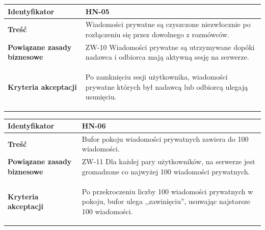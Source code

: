 \vspace{2em}

\begin{tabular}{ | l | l | }
	\hline
		\textbf{Identyfikator} &
		HN-05
		\\

	\hline
		\textbf{Treść} & \parbox[t]{13cm}{
			Wiadomości prywatne są czyszczone niezwłocznie po rozłączeniu się przez dowolnego z rozmówców.
		}\\

	\hline
		\parbox[t]{4cm}{\textbf{Powiązane zasady biznesowe}} & \parbox[t]{13cm}{
			ZW-10 Wiadomości prywatne są utrzymywane dopóki nadawca i odbiorca mają aktywną sesję na serwerze.
		}\\

	\hline
		\parbox[t]{4cm}{\textbf{Kryteria akceptacji}} & \parbox[t]{13cm}{
			\begin{enumreq}
				\item Po zamknięciu sesji użytkownika, wiadomości prywatne których był nadawcą lub odbiorcą ulegają
        usunięciu.
			\end{enumreq}
			}
		\\

	\hline
\end{tabular}

\vspace{2em}

\begin{tabular}{ | l | l | }
	\hline
		\textbf{Identyfikator} &
		HN-06
		\\

	\hline
		\textbf{Treść} & \parbox[t]{13cm}{
			Bufor pokoju wiadomości prywatnych zawiera do 100 wiadomości.
		}\\

	\hline
		\parbox[t]{4cm}{\textbf{Powiązane zasady biznesowe}} & \parbox[t]{13cm}{
			ZW-11 Dla każdej pary użytkowników, na serwerze jest gromadzone co najwyżej 100 wiadomości prywatnych.
		}\\

	\hline
		\parbox[t]{4cm}{\textbf{Kryteria akceptacji}} & \parbox[t]{13cm}{
			\begin{enumreq}
				\item Po przekroczeniu liczby 100 wiadomości prywatnych w pokoju, bufor ulega ,,zawinięciu'', usuwając najstarsze 100 wiadomości.
			\end{enumreq}
			}
		\\

	\hline
\end{tabular}

